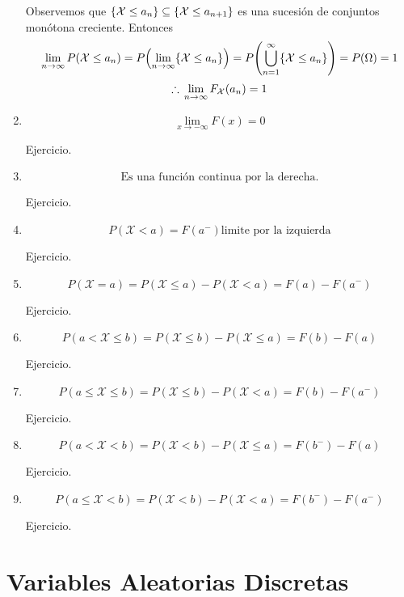 \begin{enumerate}
\begin{myproof}
      Observemos que $\{\mathcal{X} \le a_n\} \subseteq \{\mathcal{X} \le a_{n+1}\}$ es una sucesión de conjuntos monótona creciente. Entonces
      \[\lim_{n\to \infty} P(\mcX \le a_n) = P\parens*{\lim_{n\to \infty}\{\mcX \le a_n\}} = P\parens*{\bigcup_{n=1}^{\infty} \{\mcX \le a_n\}} = P(\Omega) = 1 \]
      \[\therefore \, \lim_{n\to \infty}F_{\mathcal{X}}(a_n) = 1\]
    \end{myproof}
  \item \[ \lim_{x \to -\infty} F(x) = 0\]
    \begin{myproof}
      Ejercicio.
    \end{myproof}
  \item $$\text{Es una función continua por la derecha.}$$
    \begin{myproof}
      Ejercicio.
    \end{myproof}
  \item \[ P(\mathcal X < a) = F(a^-) \text{limite por la izquierda}\]
    \begin{myproof}
      Ejercicio.
    \end{myproof}
  \item \[ P(\mathcal X = a) = P(\mathcal X \le a) - P(\mathcal X < a) = F(a) - F(a^-) \]
    \begin{myproof}
      Ejercicio.
    \end{myproof}
  \item \[ P(a< \mathcal X \le b) = P(\mathcal X \le b) - P(\mathcal X \le a) = F(b) - F(a) \]
    \begin{myproof}
      Ejercicio.
    \end{myproof}
  \item \[ P(a \le \mathcal X \le b) = P(\mathcal X \le b) - P(\mathcal X < a) = F(b) - F(a^-) \]
    \begin{myproof}
      Ejercicio.
    \end{myproof}
  \item \[ P(a < \mathcal X < b) = P(\mathcal X < b) - P(\mathcal X \le a) = F(b^-) - F(a) \]
    \begin{myproof}
      Ejercicio.
    \end{myproof}
  \item \[ P(a \le \mathcal X < b) = P(\mathcal X < b) - P(\mathcal X < a) = F(b^-) - F(a^-) \]
    \begin{myproof}
      Ejercicio.
    \end{myproof}
\end{enumerate}

\section{Variables Aleatorias Discretas}
